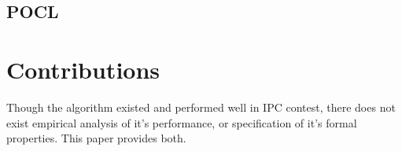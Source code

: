 \subsection{POCL} 


\section{Contributions} 
Though the algorithm existed and performed well in IPC contest, there does not exist empirical analysis of it's performance, or specification of it's formal properties. This paper provides both.



